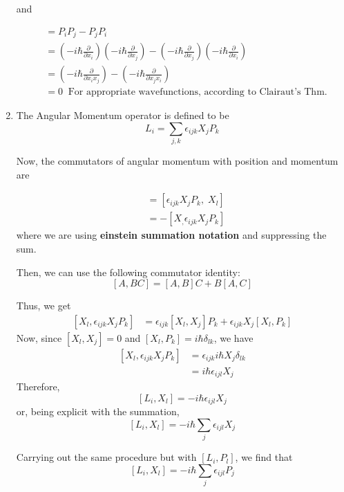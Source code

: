 \documentclass[twoside]{article}
\begin{document}
\begin{enumerate}
   and 
   
   \begin{align*}
      [P_i, P_j] &= P_i P_j - P_j P_i \\
      &= \left(-i\hbar \frac{\partial}{\partial x_i}\right)\left(-i\hbar \frac{\partial}{\partial x_j}\right) - \left(-i\hbar \frac{\partial}{\partial x_j}\right)\left(-i\hbar \frac{\partial}{\partial x_i}\right) \\
      &= \left(-i\hbar \frac{\partial}{\partial x_i x_j}\right) - \left(-i\hbar \frac{\partial}{\partial x_j x_i}\right) \\
      &= 0 \;\;\text{For appropriate wavefunctions, according to Clairaut's Thm.}
   \end{align*}
   \vskip 1cm

   \item The Angular Momentum operator is defined to be 
   \[ L_i = \sum_{j,k} \epsilon_{ijk} X_j P_k \]

   Now, the commutators of angular momentum with position and momentum are

   \begin{align*}
      [L_i, X_l] &= \left[\epsilon_{ijk} X_j P_k,\; X_l\right] \\
      &= -\left[ X_, \epsilon_{ijk} X_j P_k\right]
   \end{align*}
   where we are using \textbf{einstein summation notation} and suppressing the sum.

   Then, we can use the following commutator identity:
   \[ [A, BC] = [A, B]C + B[A, C] \]

   Thus, we get 
   \begin{align*}
      \left[ X_l, \epsilon_{ijk} X_j P_k\right] &= \epsilon_{ijk}[X_l, X_j]P_k + \epsilon_{ijk} X_j[X_l, P_k] 
   \end{align*}
   Now, since $[X_l, X_j] = 0$ and $[X_l, P_k] = i\hbar \delta_{lk}$, we have
   \begin{align*}
      \left[ X_l, \epsilon_{ijk} X_j P_k\right] &= \epsilon_{ijk}i\hbar X_j \delta_{lk} \\
      &= i\hbar \epsilon_{ijl} X_j
   \end{align*}
   Therefore,
   \[ \boxed{[L_i, X_l] = -i\hbar \epsilon_{ijl} X_j} \]
   or, being explicit with the summation, 
   \[ \boxed{[L_i, X_l] = -i\hbar \sum_j \epsilon_{ijl} X_j} \]

   Carrying out the same procedure but with $[L_i, P_l]$, we find that 
   \[ \boxed{[L_i, X_l] = -i\hbar \sum_j \epsilon_{ijl} P_j}\]
   \vskip 1cm


\end{enumerate}
\end{document}
